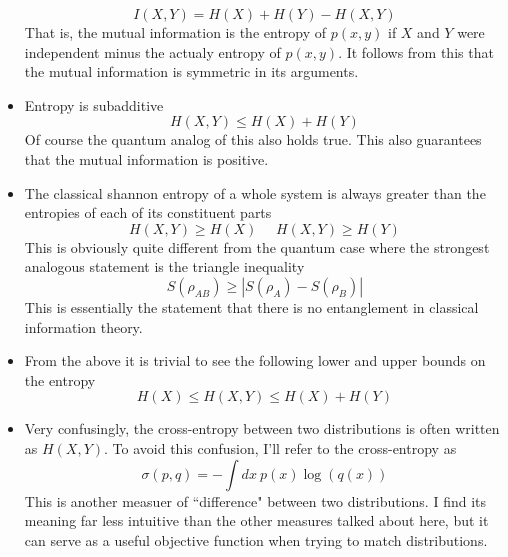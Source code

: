 \documentclass[10pt]{article}
\begin{document}
\begin{itemize}
		$$ I(X,Y) = H(X) + H(Y) - H(X,Y) $$
		That is, the mutual information is the entropy of $p(x,y)$ if $X$ and $Y$ were independent minus the actualy entropy of $p(x,y)$.  It follows from this that the mutual information is symmetric in its arguments.
	\item Entropy is subadditive
		$$ H(X,Y) \le H(X) + H(Y) $$
		Of course the quantum analog of this also holds true.  This also guarantees that the mutual information is positive.
	\item The classical shannon entropy of a whole system is always greater than the entropies of each of its constituent parts
		$$ H(X,Y) \ge H(X) ~~~~~~ H(X,Y) \ge H(Y) $$
		This is obviously quite different from the quantum case where the strongest analogous statement is the triangle inequality
		$$ S(\rho_{AB}) \ge |S(\rho_{A}) - S(\rho_{B})| $$
		This is essentially the statement that there is no entanglement in classical information theory.
	\item From the above it is trivial to see the following lower and upper bounds on the entropy
		$$ H(X) \le H(X,Y) \le H(X) + H(Y) $$
	\item Very confusingly, the cross-entropy between two distributions is often written as $H(X,Y)$.  To avoid this confusion, I'll refer to the cross-entropy as
		$$ \sigma(p,q) = -\int dx~ p(x)\log(q(x)) $$
		This is another measuer of ``difference" between two distributions.  I find its meaning far less intuitive than the other measures talked about here, but it can serve as a useful objective function when trying to match distributions.
\end{itemize}
\end{document}
